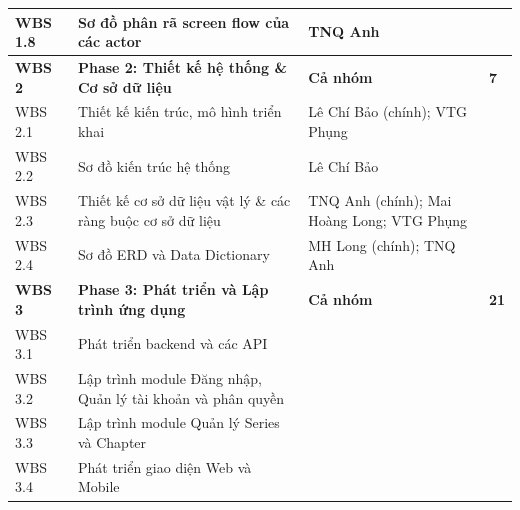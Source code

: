 \begin{longtable}{|C{0.13\textwidth}|C{0.43\textwidth}|C{0.27\textwidth}|C{0.11\textwidth}|}
\hline

WBS 1.8 &
Sơ đồ phân rã screen flow của các actor &
TNQ Anh & \\

\hline


\textbf{WBS 2} &
\textbf{Phase 2: Thiết kế hệ thống \& Cơ sở dữ liệu} &
\textbf{Cả nhóm} &
\textbf{7} \\

\hline

WBS 2.1 &
Thiết kế kiến trúc, mô hình triển khai &
Lê Chí Bảo (chính); VTG Phụng & \\

\hline

WBS 2.2 &
Sơ đồ kiến trúc hệ thống &
Lê Chí Bảo & \\

\hline

WBS 2.3 &
Thiết kế cơ sở dữ liệu vật lý \& các ràng buộc cơ sở dữ liệu &
TNQ Anh (chính); Mai Hoàng Long; VTG Phụng & \\

\hline

WBS 2.4 &
Sơ đồ ERD và Data Dictionary &
MH Long (chính); TNQ Anh & \\

\hline


\textbf{WBS 3} &
\textbf{Phase 3: Phát triển và Lập trình ứng dụng} &
\textbf{Cả nhóm} &
\textbf{21} \\

\hline

WBS 3.1 &
Phát triển backend và các API & & \\

\hline

WBS 3.2 &
Lập trình module Đăng nhập, Quản lý tài khoản và phân quyền & & \\

\hline

WBS 3.3 &
Lập trình module Quản lý Series và Chapter & & \\

\hline

WBS 3.4 &
Phát triển giao diện Web và Mobile & & \\

\hline


\end{longtable}
